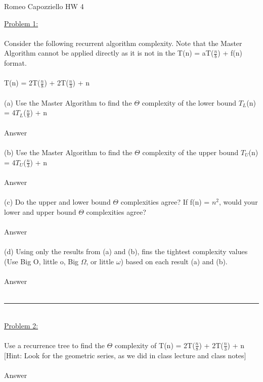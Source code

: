 \documentclass{article}
\begin{document}
    \begin{center}
        Romeo Capozziello HW 4
    \end{center}
    \underline{Problem 1:}\\\\
    Consider the following recurrent algorithm complexity. Note that the Master Algorithm cannot be applied directly as it is not in the T(n) = aT($\frac{n}{b}$) + f(n) format.\\
    \\
    \indent T(n) = 2T($\frac{n}{8}$) + 2T($\frac{n}{3}$) + n\\
    \\
    (a) Use the Master Algorithm to find the $\Theta$ complexity of the lower bound $T_L$(n) = 4$T_L$($\frac{n}{8}$) + n\\
    \\
    \indent Answer\\
    \\
    (b) Use the Master Algorithm to find the $\Theta$ complexity of the upper bound $T_U$(n) = 4$T_U$($\frac{n}{3}$) + n\\
    \\
    \indent Answer\\
    \\
    (c) Do the upper and lower bound $\Theta$ complexities agree? If f(n) = $n^2$, would your lower and upper bound $\Theta$ complexities agree?\\
    \\
    \indent Answer\\
    \\
    (d) Using only the results from (a) and (b), fins the tightest complexity values (Use Big O, little o, Big $\Omega$, or little $\omega$) based on each result (a) and (b).\\
    \\
    \indent Answer\\
    \\
    \rule{\textwidth}{0.5pt}\\
    \underline{Problem 2:}\\\\
    Use a recurrence tree to find the $\Theta$ complexity of T(n) = 2T($\frac{n}{8}$) + 2T($\frac{n}{3}$) + n\\
    $[$Hint: Look for the geometric series, as we did in class lecture and class notes$]$\\
    \\
    \indent Answer\\
    \\
\end{document}
